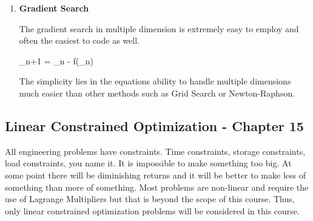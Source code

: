 \begin{enumerate}
\item {\bf Gradient Search}

The gradient search in multiple dimension is extremely easy to employ
and often the easiest to code as well.

\beq
{}_{n+1} = _n - \alpha \nabla f(_n)
\eeq

The simplicity lies in the equations ability to handle multiple
dimensions much easier than other methods such as Grid Search or
Newton-Raphson. 

\end{enumerate}

\subsection { Linear Constrained Optimization - Chapter 15}

All engineering problems have constraints. Time constraints, storage
constraints, load constraints, you name it. It is impossible to make
something too big. At some point there will be diminishing returns and
it will be better to make less of something than more of
something. Most problems are non-linear and require the use of
Lagrange Multipliers but that is beyond the scope of this
course. Thus, only linear constrained optimization problems will be
considered in this course. 

